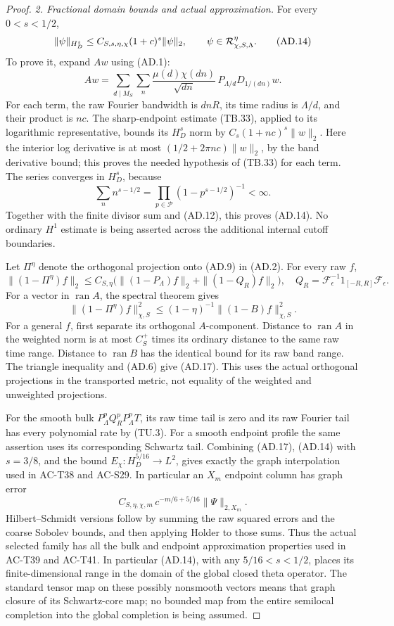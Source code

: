 \begin{proof}
\emph{2. Fractional domain bounds and actual approximation.}
For every \(0<s<1/2\),
\[
       \|\psi\|_{H_D^s}
               \leq C_{S,s,\eta,\chi}(1+c)^s\|\psi\|_2,
                  \qquad \psi\in{\cal R}_{\chi,S,\Lambda}^{\eta}.
 \tag{AD.14}
\]
To prove it, expand \(A w\) using (AD.1):
\[
 Aw=\sum_{d\mid M_S}\sum_n
       \frac{\mu(d)\chi(dn)}{\sqrt{dn}}\,
                  P_{\Lambda/d}D_{1/(dn)}w .
 \tag{AD.15}
\]
For each term, the raw Fourier bandwidth is
\(dnR\), its time radius is \(\Lambda/d\), and
their product is \(nc\).
The sharp-endpoint estimate (TB.33), applied to
its logarithmic representative, bounds its
\(H_D^s\) norm by
\(C_s(1+nc)^s\|w\|_2\).
Here the interior log derivative is at most
\((1/2+2\pi nc)\|w\|_2\), by the band derivative
bound; this proves the needed hypothesis of
(TB.33) for each term.
The series converges in \(H_D^s\), because
\[
       \sum_n n^{s-1/2}
            =\prod_{p\in\mathcal P}(1-p^{s-1/2})^{-1}<\infty .
 \tag{AD.16}
\]
Together with the finite divisor sum and (AD.12),
this proves (AD.14).
No ordinary \(H^1\) estimate is being asserted
across the additional internal cutoff boundaries.

Let \(\Pi^\eta\) denote the orthogonal projection
onto (AD.9) in (AD.2).
For every raw \(f\),
\[
 \|(1-\Pi^\eta)f\|_2
   \leq C_{S,\eta}\bigl(
           \|(1-P_\Lambda)f\|_2+
           \|(1-Q_R)f\|_2\bigr),
 \quad Q_R=\mathcal F_\epsilon^{-1}
                         1_{[-R,R]}\mathcal F_\epsilon .
 \tag{AD.17}
\]
For a vector in \(\operatorname{ran}A\), the
spectral theorem gives
\[
 \|(1-\Pi^\eta)f\|_{\chi,S}^2
       \leq(1-\eta)^{-1}\|(1-B)f\|_{\chi,S}^2 .
 \]
For a general \(f\), first separate its orthogonal
\(A\)-component.  Distance to \(\operatorname{ran}A\)
in the weighted norm is at most \(C_S^+\) times
its ordinary distance to the same raw time range.
Distance to \(\operatorname{ran}B\) has the
identical bound for its raw band range.
The triangle inequality and (AD.6) give (AD.17).
This uses the actual orthogonal projections in
the transported metric, not equality of the
weighted and unweighted projections.

For the smooth bulk \(P^p_\Lambda Q_R^pP^p_\Lambda T\),
its raw time tail is zero and its raw Fourier
tail has every polynomial rate by (TU.3).
For a smooth endpoint profile the same assertion
uses its corresponding Schwartz tail.
Combining (AD.17), (AD.14) with \(s=3/8\), and
the bound \(E_\chi:H_D^{5/16}\to L^2\), gives
exactly the graph interpolation used in AC-T38
and AC-S29.  In particular an \(X_m\) endpoint
column has graph error
\[
          C_{S,\eta,\chi,m}\,
                        c^{-m/6+5/16}\|\Psi\|_{2,X_m}.
 \tag{AD.18}
\]
Hilbert--Schmidt versions follow by summing the
raw squared errors and the coarse Sobolev bounds,
and then applying Holder to those sums.
Thus the actual selected family has all the
bulk and endpoint approximation properties
used in AC-T39 and AC-T41.
In particular (AD.14), with any
\(5/16<s<1/2\), places its finite-dimensional
range in the domain of the global closed
theta operator.  The standard tensor map
on these possibly nonsmooth vectors means
that graph closure of its Schwartz-core map;
no bounded map from the entire semilocal
completion into the global completion is
being assumed.


\end{proof}
